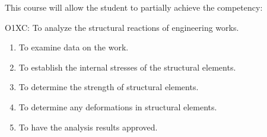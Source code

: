{This course will allow the student to partially achieve the competency:

O1XC:  To analyze the structural reactions of engineering works.
\begin{enumerate}
\item To examine data on the work.
\item To establish the internal stresses of the structural elements.
\item To determine the strength of structural elements.
\item To determine any deformations in structural elements.
\item To have the analysis results approved.
\end{enumerate}
}